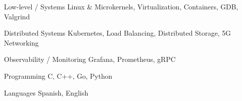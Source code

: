 

\begin{cvskills}
  \cvskill
    {Low-level / Systems} %
    {Linux \& Microkernels, Virtualization, Containers, GDB, Valgrind}  %

  \cvskill
    {Distributed Systems} %
    {Kubernetes, Load Balancing, Distributed Storage, 5G Networking} %

  \cvskill
    {Observability / Monitoring} %
    {Grafana, Prometheus, gRPC} %

  \cvskill
    {Programming} %
    {C, C++, Go, Python} %

  \cvskill
    {Languages} %
    {Spanish, English} %

\end{cvskills}
